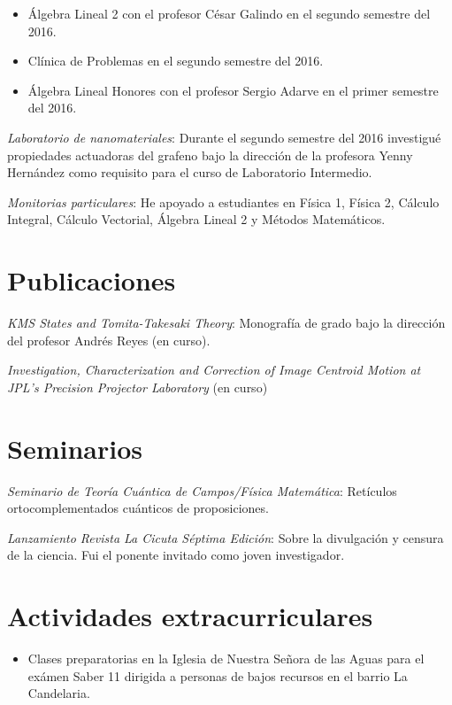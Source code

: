 \documentclass[line,margin]{res}
\begin{document}
\begin{resume}
\begin{itemize}
\item Álgebra Lineal 2 con el profesor César Galindo en el segundo semestre del 2016.

\item Clínica de Problemas en el segundo semestre del 2016.

\item Álgebra Lineal Honores con el profesor Sergio Adarve en el primer semestre del 2016.

\end{itemize}

{\sl Laboratorio de nanomateriales}: Durante el segundo semestre del 2016 investigué propiedades actuadoras del grafeno bajo la dirección de la profesora Yenny Hernández como requisito para el curso de Laboratorio Intermedio.
  
{\sl Monitorias particulares}: He apoyado a estudiantes en Física 1, Física 2, Cálculo Integral, Cálculo Vectorial, Álgebra Lineal 2 y  Métodos Matemáticos. 

\section{Publicaciones}

{\sl KMS States and Tomita-Takesaki Theory}: Monografía de grado bajo la dirección del profesor Andrés Reyes (en curso).

{\sl Investigation, Characterization and Correction of Image Centroid Motion at JPL's Precision Projector Laboratory} (en curso)

\section{Seminarios}

{\sl Seminario de Teoría Cuántica de Campos/Física Matemática}: Retículos ortocomplementados cuánticos de proposiciones.

{\sl Lanzamiento Revista La Cicuta Séptima Edición}: Sobre la divulgación y censura de la ciencia. Fui el ponente invitado como joven investigador. 
  
\section{Actividades extracurriculares}

\begin{itemize}

\item Clases preparatorias en la Iglesia de Nuestra Señora de las Aguas para el exámen Saber 11 dirigida a personas de bajos recursos en el barrio La Candelaria.


\end{itemize}
\end{resume}
\end{document}

